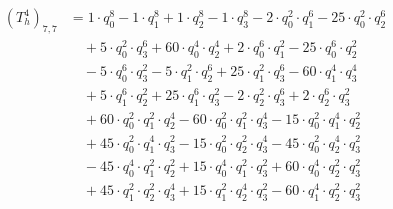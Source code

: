 \begin{align*}(T_{h}^4)_{7,7}&=1\cdot q_0^{8}-1\cdot q_1^{8}+1\cdot q_2^{8}-1\cdot q_3^{8}-2\cdot q_0^{2}\cdot q_1^{6}-25\cdot q_0^{2}\cdot q_2^{6}\\
&\quad +5\cdot q_0^{2}\cdot q_3^{6}+60\cdot q_0^{4}\cdot q_2^{4}+2\cdot q_0^{6}\cdot q_1^{2}-25\cdot q_0^{6}\cdot q_2^{2}\\
&\quad -5\cdot q_0^{6}\cdot q_3^{2}-5\cdot q_1^{2}\cdot q_2^{6}+25\cdot q_1^{2}\cdot q_3^{6}-60\cdot q_1^{4}\cdot q_3^{4}\\
&\quad +5\cdot q_1^{6}\cdot q_2^{2}+25\cdot q_1^{6}\cdot q_3^{2}-2\cdot q_2^{2}\cdot q_3^{6}+2\cdot q_2^{6}\cdot q_3^{2}\\
&\quad +60\cdot q_0^{2}\cdot q_1^{2}\cdot q_2^{4}-60\cdot q_0^{2}\cdot q_1^{2}\cdot q_3^{4}-15\cdot q_0^{2}\cdot q_1^{4}\cdot q_2^{2}\\
&\quad +45\cdot q_0^{2}\cdot q_1^{4}\cdot q_3^{2}-15\cdot q_0^{2}\cdot q_2^{2}\cdot q_3^{4}-45\cdot q_0^{2}\cdot q_2^{4}\cdot q_3^{2}\\
&\quad -45\cdot q_0^{4}\cdot q_1^{2}\cdot q_2^{2}+15\cdot q_0^{4}\cdot q_1^{2}\cdot q_3^{2}+60\cdot q_0^{4}\cdot q_2^{2}\cdot q_3^{2}\\
&\quad +45\cdot q_1^{2}\cdot q_2^{2}\cdot q_3^{4}+15\cdot q_1^{2}\cdot q_2^{4}\cdot q_3^{2}-60\cdot q_1^{4}\cdot q_2^{2}\cdot q_3^{2}\end{align*}
